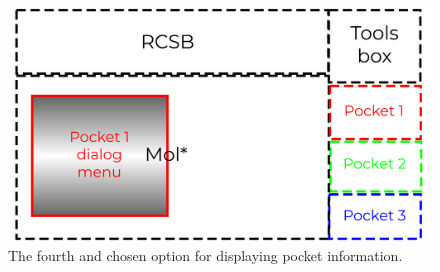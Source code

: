 \begin{figure}[htb]
	\centering
	\includegraphics[width=1\linewidth]{img/dialog_4-svg.pdf}
	\caption{The fourth and chosen option for displaying pocket information.}
	\label{fig:dialog-4}
\end{figure}